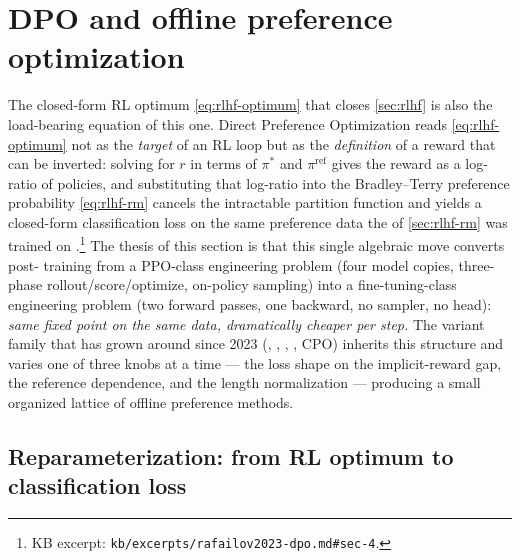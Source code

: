 
\section{DPO and offline preference optimization}
\label{sec:dpo}

The closed-form RL optimum \cref{eq:rlhf-optimum} that closes
\cref{sec:rlhf} is also the load-bearing equation of this one. Direct
Preference Optimization \citep{rafailov2023-dpo} reads
\cref{eq:rlhf-optimum} not as the \emph{target} of an RL loop but as the
\emph{definition} of a reward that can be inverted: solving for $r$ in
terms of $\pi^*$ and $\pi^{\mathrm{ref}}$ gives the reward as a
log-ratio of policies, and substituting that log-ratio into the
Bradley--Terry preference probability \cref{eq:rlhf-rm} cancels the
intractable partition function and yields a closed-form classification
loss on the same preference data the  of
\cref{sec:rlhf-rm} was trained on \citep[\S 4]{rafailov2023-dpo}.\footnote{KB
excerpt: \texttt{kb/excerpts/rafailov2023-dpo.md\#sec-4}.} The thesis
of this section is that this single algebraic move converts post-
training from a PPO-class engineering problem (four model copies, three-
phase rollout/score/optimize, on-policy sampling) into a
fine-tuning-class engineering problem (two forward passes, one backward,
no sampler, no  head): \emph{same fixed point on the same data,
dramatically cheaper per step.} The variant family that has grown
around  since 2023 (, , , , CPO) inherits this
structure and varies one of three knobs at a time --- the loss shape on
the implicit-reward gap, the reference dependence, and the length
normalization --- producing a small organized lattice of offline
preference methods.

\subsection{Reparameterization: from RL optimum to classification loss}
\label{sec:dpo-derivation}

